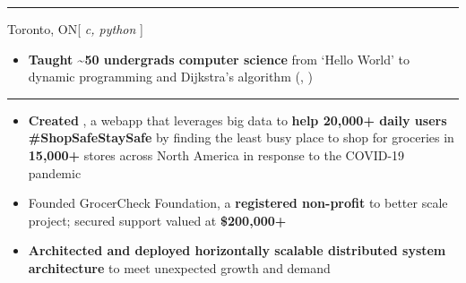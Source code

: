 \documentclass[10pt,a4paper,ragged2e,withhyper]{altacv}
\begin{document}
{\color{accent}\hrule \vspace{0.1cm}}
 {Toronto, ON}{[ \textit{c, python} ]}
\begin{itemize}
  \item \textbf{Taught \textasciitilde50 undergrads computer science} from `Hello World' to dynamic programming and Dijkstra's algorithm (, )
\end{itemize}

{\color{accent}\hrule \vspace{0.1cm}}
\begin{itemize}
  \item \textbf{Created }, a webapp that leverages big data to \textbf{help 20,000+ daily users \#ShopSafeStaySafe} by finding the least busy place to shop for groceries in \textbf{15,000+} stores across North America in response to the COVID-19 pandemic
  \item Founded GrocerCheck Foundation, a \textbf{registered non-profit} to better scale project; secured support valued at \textbf{\$200,000+}
  \item \textbf{Architected and deployed horizontally scalable distributed system architecture} to meet unexpected growth and demand
\end{itemize}
\end{document}

